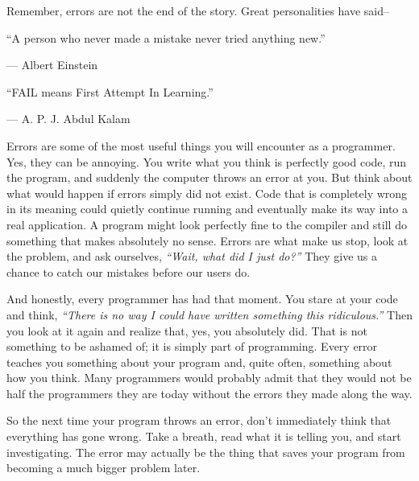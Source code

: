 	\begin{notebox}
		\setlength{\parindent}{1.5em}
		Remember, errors are not the end of the story. Great personalities have said--
		
		\vspace{1.0cm}
		
		``A person who never made a mistake never tried anything new.''
		
		\begin{flushright}
			--- Albert Einstein
		\end{flushright}
		
		``FAIL means First Attempt In Learning.''
		
		\begin{flushright}
			--- A. P. J. Abdul Kalam
		\end{flushright}
		
		Errors are some of the most useful things you will encounter as a programmer.	Yes, they can be annoying. You write what you think is perfectly good code, run the program, and suddenly the computer throws an error at you. But think	about what would happen if errors simply did not exist. Code that is completely wrong in its meaning could quietly continue running and eventually make its way	into a real application. A program might look perfectly fine to the compiler and still do something that makes absolutely no sense. Errors are what make us stop, look at the problem, and ask ourselves, \textit{``Wait, what did I just do?''} They give us a chance to catch our mistakes before our users do.
		
		And honestly, every programmer has had that moment. You stare at your code and	think, \textit{``There is no way I could have written something this ridiculous.''} Then you look at it again and realize that, yes, you absolutely did. That is	not something to be ashamed of; it is simply part of programming. Every error teaches you something about your program and, quite often, something about how you think. Many programmers would probably admit that they would not be half the programmers they are today without the errors they made along the way.
		
		
		So the next time your program throws an error, don't immediately think that
		everything has gone wrong. Take a breath, read what it is telling you, and
		start investigating. The error may actually be the thing that saves your
		program from becoming a much bigger problem later.
	\end{notebox}